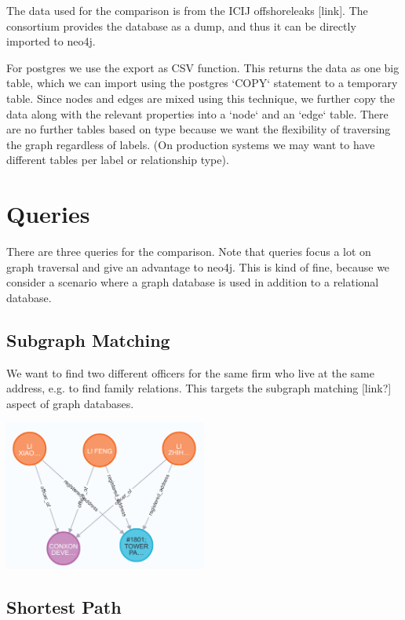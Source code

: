 \documentclass[11pt, a4paper,oneside,chapterprefix=false]{scrbook}
\begin{document}
The data used for the comparison is from the ICIJ offshoreleaks [link].
The consortium provides the database as a dump, and thus it can be directly imported to neo4j.

For postgres we use the export as CSV function.
This returns the data as one big table, which we can import using the postgres `COPY` statement to a temporary table.
Since nodes and edges are mixed using this technique, we further copy the data along with the relevant properties into a `node` and an `edge` table.
There are no further tables based on type because we want the flexibility of traversing the graph regardless of labels.
(On production systems we may want to have different tables per label or relationship type).

\section{Queries} \label{sec:benchmark}

There are three queries for the comparison. Note that queries focus a lot on graph traversal and give an advantage to neo4j. 
This is kind of fine, because we consider a scenario where a graph database is used in addition to a relational database.


\subsection{Subgraph Matching}

We want to find two different officers for the same firm who live at the same address, e.g. to find family relations.
This targets the subgraph matching [link?] aspect of graph databases.

\includegraphics*[width=0.5\textwidth]{figures/query_relation.png} \hfill

\subsection{Shortest Path}
\end{document}
